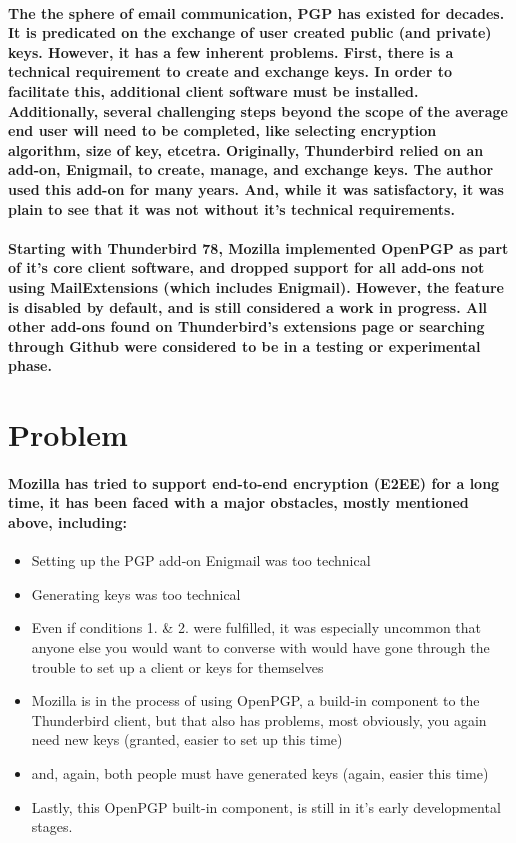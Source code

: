 \paragraph{The the sphere of email communication, PGP has existed for decades. It is predicated on the exchange of user created public (and private) keys. However, it has a few inherent problems. First, there is a technical requirement to create and exchange keys. In order to facilitate this, additional client software must be installed. Additionally, several challenging steps beyond the scope of the average end user will need to be completed, like selecting encryption algorithm, size of key, etcetra. Originally, Thunderbird relied on an add-on, Enigmail, to create, manage, and exchange keys. The author used this add-on for many years. And, while it was satisfactory, it was plain to see that it was not without it's technical requirements.}

\paragraph{Starting with Thunderbird 78, Mozilla implemented OpenPGP as part of it's core client software, and dropped support for all add-ons not using MailExtensions (which includes Enigmail). However, the feature is disabled by default, and is still considered a work in progress. All other add-ons found on Thunderbird's extensions page or searching through Github were considered to be in a testing or experimental phase.}

\section{Problem}

\paragraph{Mozilla has tried to support end-to-end encryption (E2EE) for a long time, it has been faced with a major obstacles, mostly mentioned above, including:}

\begin{itemize}
\item Setting up the PGP add-on Enigmail was too technical
\item Generating keys was too technical
\item Even if conditions 1. \& 2. were fulfilled, it was especially uncommon that anyone else you would want to converse with would have gone through the trouble to set up a client or keys for themselves
\item Mozilla is in the process of using OpenPGP, a build-in component to the Thunderbird client, but that also has problems, most obviously, you again need new keys (granted, easier to set up this time)
\item and, again, both people must have generated keys (again, easier this time)
\item Lastly, this OpenPGP built-in component, is still in it's early developmental stages.
\end{itemize}

